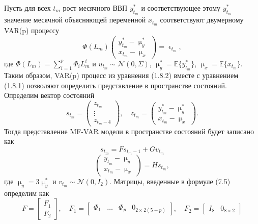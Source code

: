 \documentclass[a4paper, 14pt]{extreport}
\numberwithin{equation}{subsection}
\renewcommand{\mu}{\upmu}
\renewcommand{\epsilon}{\upvarepsilon}
\numberwithin{equation}{section}
\begin{document}
	Пусть для всех $t_m$ рост месячного ВВП $y^*_{t_m}$ и соответствующее этому $y^*_{t_m}$ значение месячной объясняющей переменной $x_{t_m}$ соответствуют двумерному VAR(p) процессу
	\begin{equation}
		\Phi(L_m)\begin{pmatrix}
		y^*_{t_m} - \mu_y^*\\
		x_{t_m} - \mu_x
	\end{pmatrix} = \epsilon_{t_m},
	\end{equation}
	где $\Phi(L_m) = \sum_{i=1}^{p}\Phi_i L_m^i$ и $u_{t_m}\sim \mathcal{N}(0, \Sigma)$, $\mu^*_y = \mathbb{E}\{y_{t_m}^*\}$, $\mu_x = \mathbb{E}\{x_{t_m}\}$.
	Таким образом, VAR(p) процесс из уравнения (1.8.2) вместе с уравнением (1.8.1) позволяют определить представление в пространстве состояний. Определим вектор состояний 
	\begin{equation}
		s_{t_m} = \begin{pmatrix}
		z_{t_m} \\ \vdots \\ z_{t_m - 4}
	\end{pmatrix},\quad z_{t_m} = \begin{pmatrix}
		y^*_{t_m} - \mu_y^*\\
		x_{t_m} - \mu_x
	\end{pmatrix}.
	\end{equation}
	Тогда представление MF-VAR модели в пространстве состояний будет записано как 
	\begin{equation}
		s_{t_m} = Fs_{t_m-1} + G v_{t_m}
	\end{equation}
	\begin{equation}
		\begin{pmatrix}
		y_{t_m} - \mu_y\\
		x_{t_m} - \mu_x
	\end{pmatrix} = Hs_{t_m},
	\end{equation}
	где $\mu_y = 3 \mu_y^*$ и $v_{t_m} \sim \mathcal{N} (0, I_2)$. Матрицы, введенные в формуле (7.5) определим как 
	\begin{equation}
		F=\begin{bmatrix}
		F_1 \\ F_2
	\end{bmatrix},\quad F_1 = \begin{bmatrix}
		\Phi_1 & \ldots & \Phi_p & 0_{2\times 2(5-p)}
	\end{bmatrix},\quad F_2 = \begin{bmatrix}
		I_8 & 0_{8\times 2}
	\end{bmatrix}
	\end{equation}
\end{document}
